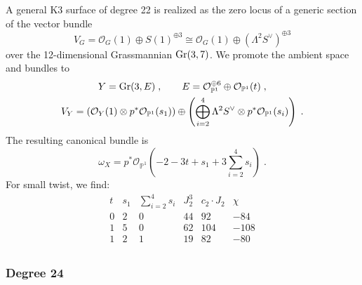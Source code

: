 \documentclass[11pt,a4paper]{article}
\numberwithin{equation}{section}
\numberwithin{table}{section}\setlength{\multlinegap}{25pt}
\begin{document}
A general K3 surface of degree 22 is realized as the zero locus of a generic section of the vector bundle~\cite{Mukai5}
\begin{equation}
    \label{eq:Degree22FiberDefiningBundle}
    V_G=\mathcal{O}_G(1)\oplus S(1)^{\oplus 3}\cong \mathcal{O}_G(1)\oplus \left(\Lambda^2 S^\vee\right)^{\oplus 3}
\end{equation}
over the 12-dimensional Grassmannian $\textup{Gr}(3,7)$. We promote the ambient space and bundles to
\begin{equation}
    \begin{gathered}
        Y = \textup{Gr}(3,E)\;,\qquad E = \mathcal{O}_{\mathbb{P}^1}^{\oplus 6}\oplus \mathcal{O}_{\mathbb{P}^1}(t)\;,\\
    V_Y=\left(\mathcal{O}_Y(1)\otimes p^*\mathcal{O}_{\mathbb{P}^1}(s_1)\right)\oplus \left(\bigoplus_{i=2}^4 \Lambda^2 S^\vee\otimes p^*\mathcal{O}_{\mathbb{P}^1}(s_i)\right)\;.
    \end{gathered}
\end{equation}
The resulting canonical bundle is
\begin{equation}
    \omega_X=p^*\mathcal{O}_{\mathbb{P}^1}(-2-3t+s_1+3\textstyle{\sum}_{i=2}^4s_i)\;.
\end{equation}
For small twist, we find:
\begin{equation}
    \begin{array}{cccccc}
        t & s_1 & \textstyle{\sum}_{i=2}^4s_i & J_2^3 & c_2\cdot J_2 & \chi\\
        \hline
        0 & 2 & 0 & 44 & 92 & -84\\
        1 & 5 & 0 & 62 & 104 & -108\\
        1 & 2 & 1 & 19 & 82 & -80\\
    \end{array}
\end{equation}

\subsubsection*{Degree 24}
\end{document}
